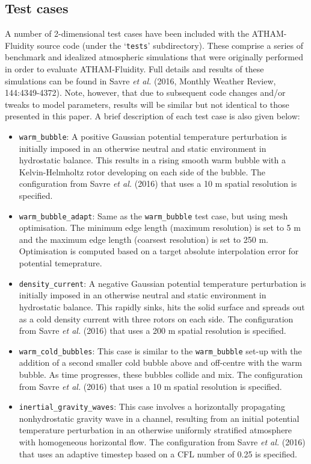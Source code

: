 \documentclass[10pt,a4paper]{article}
\begin{document}
\subsection{Test cases}
A number of 2-dimensional test cases have been included with the ATHAM-Fluidity source code (under the `\texttt{tests}' subdirectory). These comprise a series of benchmark and idealized atmospheric simulations that were originally performed in order to evaluate ATHAM-Fluidity. Full details and results of these simulations can be found in Savre \textit{et al.} (2016, Monthly Weather Review, 144:4349-4372). Note, however, that due to subsequent code changes and/or tweaks to model parameters, results will be similar but not identical to those presented in this paper. A brief description of each test case is also given below:

\begin{itemize}
\item \texttt{warm\_bubble}: A positive Gaussian potential temperature perturbation is initially imposed in an otherwise neutral and static environment in hydrostatic balance. This results in a rising smooth warm bubble with a Kelvin-Helmholtz rotor developing on each side of the bubble. The configuration from Savre \textit{et al.} (2016) that uses a 10 m spatial resolution is specified.
\item \texttt{warm\_bubble\_adapt}: Same as the \texttt{warm\_bubble} test case, but using mesh optimisation. The minimum edge length (maximum resolution) is set to 5 m and the maximum edge length (coarsest resolution) is set to 250 m. Optimisation is computed based on a target absolute interpolation error for potential temeprature.
\item \texttt{density\_current}: A negative Gaussian potential temperature perturbation is initially imposed in an otherwise neutral and static environment in hydrostatic balance. This rapidly sinks, hits the solid surface and spreads out as a cold density current with three rotors on each side. The configuration from Savre \textit{et al.} (2016) that uses a 200 m spatial resolution is specified.
\item \texttt{warm\_cold\_bubbles}: This case is similar to the \texttt{warm\_bubble} set-up with the addition of a second smaller cold bubble above and off-centre with the warm bubble. As time progresses, these bubbles collide and mix. The configuration from Savre \textit{et al.} (2016) that uses a 10 m spatial resolution is specified.
\item \texttt{inertial\_gravity\_waves}: This case involves a horizontally propagating nonhydrostatic gravity wave in a channel, resulting from an initial potential temperature perturbation in an otherwise uniformly stratified atmosphere with homogeneous horizontal flow. The configuration from Savre \textit{et al.} (2016) that uses an adaptive timestep based on a CFL number of 0.25 is specified.

\end{itemize}
\end{document}
